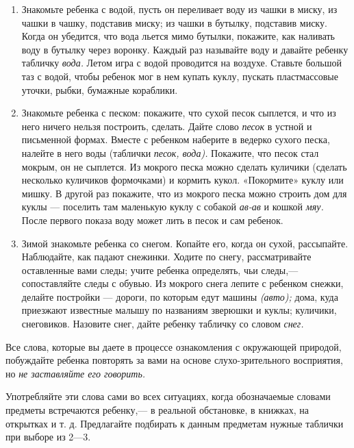 \documentclass[a5paper]{book}
\renewcommand{\emph}[1]{\textit{#1}}
\begin{document}
\begin{enumerate}
\def\labelenumi{\arabic{enumi}.}
\setcounter{enumi}{4}
\item
  
  Знакомьте ребенка с водой, пусть он переливает воду из чашки в миску,
  из чашки в чашку, подставив миску; из чашки в бутылку, подставив
  миску. Когда он убедится, что вода льется мимо бутылки, покажите, как
  наливать воду в бутылку через воронку. Каждый раз называйте воду и
  давайте ребенку табличку \emph{вода.} Летом игра с водой проводится на
  воздухе. Ставьте большой таз с водой, чтобы ребенок мог в нем купать
  куклу, пускать пластмассовые уточки, рыбки, бумажные кораблики.
  
\item
  
  Знакомьте ребенка с песком: покажите, что сухой песок сыплется, и что
  из него ничего нельзя построить, сделать. Дайте слово \emph{песок} в
  устной и письменной формах. Вместе с ребенком наберите в ведерко
  сухого песка, налейте в него воды (таблички \emph{песок, вода).}
  Покажите, что песок стал мокрым, он не сыплется. Из мокрого песка
  можно сделать куличики (сделать несколько куличиков формочками) и
  кормить кукол. «Покормите» куклу или мишку. В другой раз покажите, что
  из мокрого песка можно строить дом для куклы --- поселить там
  маленькую куклу с собакой \emph{ав-ав} и кошкой \emph{мяу.} После
  первого показа воду может лить в песок и сам ребенок.
  
\item
  
  Зимой знакомьте ребенка со снегом. Копайте его, когда он сухой,
  рассыпайте. Наблюдайте, как падают снежинки. Ходите по снегу,
  рассматривайте оставленные вами следы; учите ребенка определять, чьи
  следы,--- сопоставляйте следы с обувью. Из мокрого снега лепите с
  ребенком снежки, делайте постройки --- дороги, по которым едут машины
  \emph{(авто);} дома, куда приезжают известные малышу по названиям
  зверюшки и куклы; куличики, снеговиков. Назовите снег, дайте ребенку
  табличку со словом \emph{снег.}
  
\end{enumerate}


Все слова, которые вы даете в процессе ознакомления с окружающей
природой, побуждайте ребенка повторять за вами на основе
слухо-зрительного восприятия, но \emph{не заставляйте его говорить.}

Употребляйте эти слова сами во всех ситуациях, когда обозначаемые
словами предметы встречаются ребенку,--- в реальной обстановке, в
книжках, на открытках и т. д. Предлагайте подбирать к данным предметам
нужные таблички при выборе из 2---3.
\end{document}

